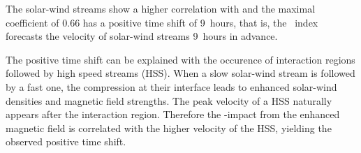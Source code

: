 The solar-wind streams show a higher correlation with \Kp{} and the maximal coefficient of 0.66 has a positive time shift of 9~hours, that is, the \Kp~index forecasts the velocity of solar-wind streams 9~hours in advance.

The positive time shift can be explained with the occurence of interaction regions followed by high speed streams (HSS). When a slow solar-wind stream is followed by a fast one, the compression at their interface leads to enhanced solar-wind densities and magnetic field strengths. The peak velocity of a HSS naturally appears after the interaction region. Therefore the \Kp-impact from the enhanced magnetic field is correlated with the higher velocity of the HSS, yielding the observed positive time shift.


